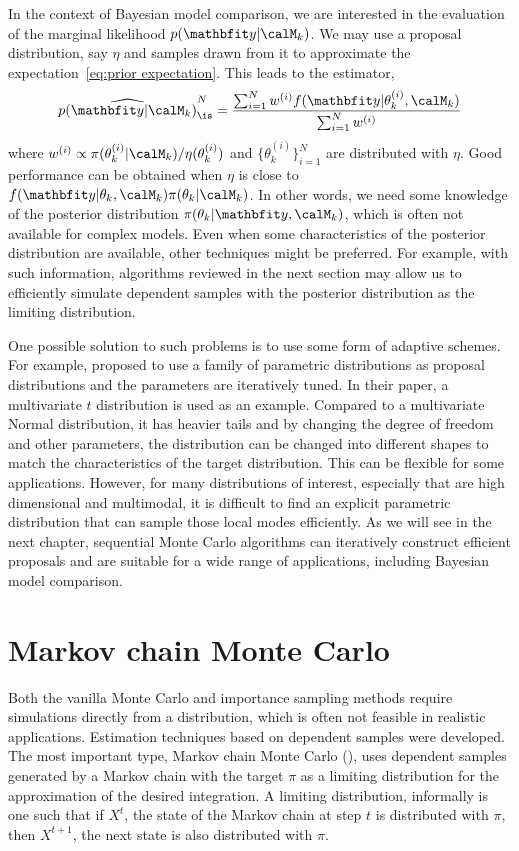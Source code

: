 In the context of Bayesian model comparison, we are interested in the
evaluation of the marginal likelihood $p(\data|\calM_k)$. We may use a
proposal distribution, say $\eta$ and samples drawn from it to approximate the
expectation~\eqref{eq:prior expectation}. This leads to the estimator,
\begin{equation}
  \widehat{p(\data|\calM_k)}_{\is}^N =
  \frac{\sum_{i=1}^N w^{(i)} f(\data|\theta_k^{(i)},\calM_k)}
  {\sum_{i=1}^N w^{(i)}}
\end{equation}
where $w^{(i)}\propto\pi(\theta_k^{(i)}|\calM_k)/\eta(\theta_k^{(i)})$ and
$\{\theta_k^{(i)}\}_{i=1}^N$ are distributed with $\eta$. Good performance
can be obtained when $\eta$ is close to
$f(\data|\theta_k,\calM_k)\pi(\theta_k|\calM_k)$. In other words, we need
some knowledge of the posterior distribution $\pi(\theta_k|\data,\calM_k)$,
which is often not available for complex models. Even when some
characteristics of the posterior distribution are available, other techniques
might be preferred. For example, with such information, algorithms reviewed
in the next section may allow us to efficiently simulate dependent samples
with the posterior distribution as the limiting distribution.

One possible solution to such problems is to use some form of adaptive
schemes. For example, \cite{ManSuk:1992vx} proposed to use a family of
parametric distributions as proposal distributions and the parameters are
iteratively tuned. In their paper, a multivariate $t$ distribution is used as
an example. Compared to a multivariate Normal distribution, it has heavier
tails and by changing the degree of freedom and other parameters, the
distribution can be changed into different shapes to match the
characteristics of the target distribution. This can be flexible for some
applications. However, for many distributions of interest, especially that
are high dimensional and multimodal, it is difficult to find an explicit
parametric distribution that can sample those local modes efficiently. As we
will see in the next chapter, sequential Monte Carlo algorithms can
iteratively construct efficient proposals and are suitable for a wide range
of applications, including Bayesian model comparison.

\section{Markov chain Monte Carlo}
\label{sec:Markov chain Monte Carlo}

Both the vanilla Monte Carlo and importance sampling methods require
simulations directly from a distribution, which is often not feasible in
realistic applications. Estimation techniques based on dependent samples were
developed. The most important type, Markov chain Monte Carlo (\mcmc), uses
dependent samples generated by a Markov chain with the target $\pi$ as a
limiting distribution for the approximation of the desired integration. A
limiting distribution, informally is one such that if $X^t$, the state of the
Markov chain at step $t$ is distributed with $\pi$, then $X^{t+1}$, the next
state is also distributed with $\pi$.


